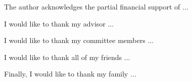 The author acknowledges the partial financial support of ...

I would like to thank my advisor ...

I would like to thank my committee members ...

I would like to thank all of my friends ...

Finally, I would like to thank my family ...
